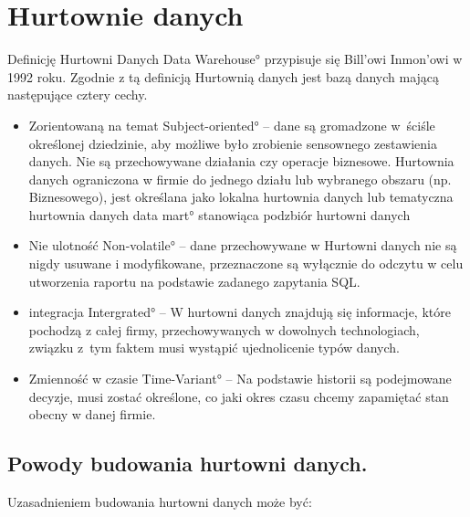 \chapter{Hurtownie danych}


Definicję Hurtowni Danych \ang{Data Warehouse}  przypisuje się Bill'owi Inmon'owi w 1992 roku.
Zgodnie z tą definicją Hurtownią danych jest bazą danych mającą następujące cztery cechy.

\begin{itemize}
 \item Zorientowaną na temat \ang{ Subject-oriented} -- dane są gromadzone 
        w~ściśle określonej dziedzinie, aby możliwe było zrobienie sensownego zestawienia danych.
        Nie są przechowywane działania czy operacje biznesowe. Hurtownia danych  ograniczona w firmie do jednego działu 
        lub wybranego obszaru (np. Biznesowego), jest określana jako lokalna hurtownia danych lub tematyczna hurtownia danych \ang{data mart} stanowiąca podzbiór hurtowni danych
 \item Nie ulotność \ang{Non-volatile} -- dane przechowywane w Hurtowni danych nie są nigdy usuwane i modyfikowane, 
        przeznaczone są wyłącznie do odczytu w celu utworzenia raportu na podstawie zadanego zapytania SQL.

 \item integracja \ang{Intergrated} -- W hurtowni danych znajdują się informacje, 
   które pochodzą z całej firmy, przechowywanych w dowolnych technologiach,
   związku z~tym faktem musi wystąpić ujednolicenie typów danych.

 \item Zmienność w czasie \ang{Time-Variant} -- Na podstawie historii są podejmowane decyzje, musi zostać określone,
  co jaki okres czasu chcemy zapamiętać stan obecny w danej firmie.

\end{itemize}


\section{Powody budowania hurtowni danych.}
   
      Uzasadnieniem budowania hurtowni danych może być:

